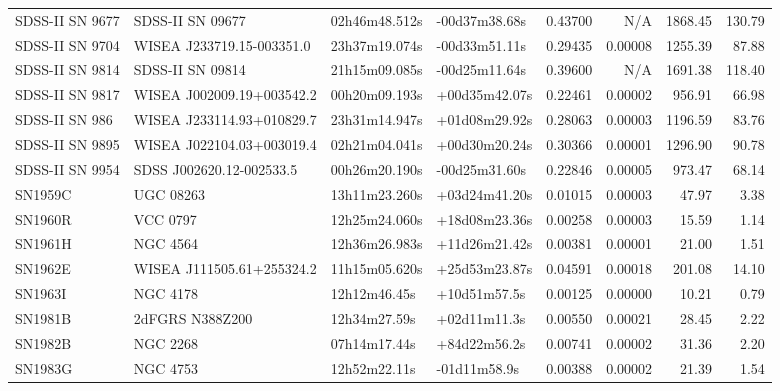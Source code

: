 \begin{longtable}{llllrrrr}
SDSS-II SN 9677  &                SDSS-II SN 09677 &   02h46m48.512s &   -00d37m38.68s &  0.43700 &      N/A &  1868.45 &      130.79 \\
SDSS-II SN 9704  &       WISEA J233719.15-003351.0 &   23h37m19.074s &   -00d33m51.11s &  0.29435 &  0.00008 &  1255.39 &       87.88 \\
SDSS-II SN 9814  &                SDSS-II SN 09814 &   21h15m09.085s &   -00d25m11.64s &  0.39600 &      N/A &  1691.38 &      118.40 \\
SDSS-II SN 9817  &       WISEA J002009.19+003542.2 &   00h20m09.193s &   +00d35m42.07s &  0.22461 &  0.00002 &   956.91 &       66.98 \\
SDSS-II SN 986   &       WISEA J233114.93+010829.7 &   23h31m14.947s &   +01d08m29.92s &  0.28063 &  0.00003 &  1196.59 &       83.76 \\
SDSS-II SN 9895  &       WISEA J022104.03+003019.4 &   02h21m04.041s &   +00d30m20.24s &  0.30366 &  0.00001 &  1296.90 &       90.78 \\
SDSS-II SN 9954  &        SDSS J002620.12-002533.5 &   00h26m20.190s &   -00d25m31.60s &  0.22846 &  0.00005 &   973.47 &       68.14 \\
SN1959C          &                       UGC 08263 &   13h11m23.260s &   +03d24m41.20s &  0.01015 &  0.00003 &    47.97 &        3.38 \\
SN1960R          &                        VCC 0797 &   12h25m24.060s &   +18d08m23.36s &  0.00258 &  0.00003 &    15.59 &        1.14 \\
SN1961H          &                        NGC 4564 &   12h36m26.983s &   +11d26m21.42s &  0.00381 &  0.00001 &    21.00 &        1.51 \\
SN1962E          &       WISEA J111505.61+255324.2 &   11h15m05.620s &   +25d53m23.87s &  0.04591 &  0.00018 &   201.08 &       14.10 \\
SN1963I          &                        NGC 4178 &    12h12m46.45s &    +10d51m57.5s &  0.00125 &  0.00000 &    10.21 &        0.79 \\
SN1981B          &                 2dFGRS N388Z200 &    12h34m27.59s &    +02d11m11.3s &  0.00550 &  0.00021 &    28.45 &        2.22 \\
SN1982B          &                        NGC 2268 &    07h14m17.44s &    +84d22m56.2s &  0.00741 &  0.00002 &    31.36 &        2.20 \\
SN1983G          &                        NGC 4753 &    12h52m22.11s &    -01d11m58.9s &  0.00388 &  0.00002 &    21.39 &        1.54 \\

\end{longtable}
